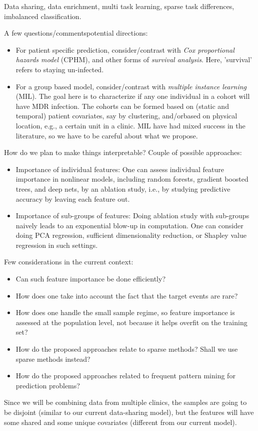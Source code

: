 Data sharing, data enrichment, multi task learning, sparse task differences, imbalanced classification.

 A few questions/commentspotential directions:
\begin{itemize}
\item For patient specific prediction, consider/contrast with {\em Cox proportional hazards model} (CPHM), and other forms of {\em survival analysis}. Here, 'survival' refers to staying un-infected.
\item For a group based model, consider/contrast with {\em multiple instance learning} (MIL). The goal here is to characterize if any one individual in a cohort will have MDR infection. The cohorts can be formed based on (static and temporal) patient covariates, say by clustering, and/orbased on physical location, e.g., a certain unit in a clinic. MIL have had mixed success in the literature, so we have to be careful about what we propose.
\end{itemize}

 How do we plan to make things interpretable? Couple of possible approaches:
\begin{itemize}
\item Importance of individual features: One can assess individual feature importance in nonlinear models, including random forests, gradient boosted trees, and deep nets, by an ablation study, i.e., by studying predictive accuracy by leaving each feature out. 
\item Importance of sub-groups of features: Doing ablation study with sub-groups naively leads to an exponential blow-up in computation. One can consider doing PCA regression, sufficient dimensionality reduction, or Shapley value regression in such settings.
\end{itemize}
Few considerations in the current context: 
\begin{itemize}
\item Can such feature importance be done efficiently? 
\item How does one take into account the fact that the target events are rare? 
\item How does one handle the small sample regime, so feature importance is assessed at the population level, not because it helps overfit on the training set?
\item How do the proposed approaches relate to sparse methods? Shall we use sparse methods instead?
\item How do the proposed approaches related to frequent pattern mining for prediction problems?
\end{itemize}

 Since we will be combining data from multiple clinics, the samples are going to be disjoint (similar to our current data-sharing model), but the features will have some shared and some unique covariates (different from our current model).

